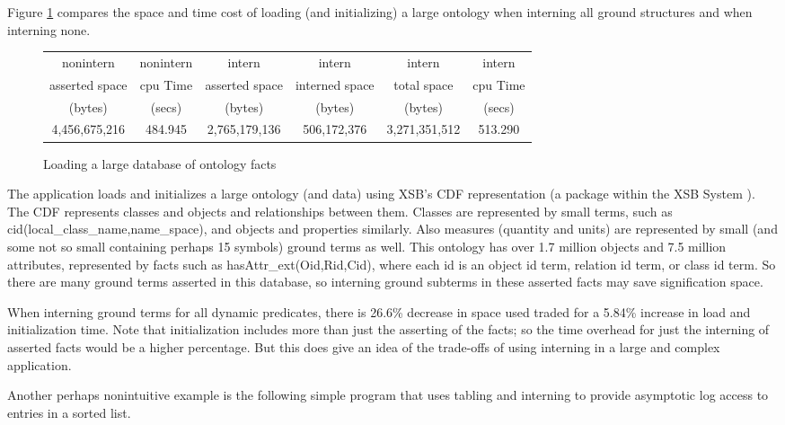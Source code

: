 \documentclass{llncs}
\begin{document}
Figure \ref{darpa-avm-table} compares the space and time cost of
loading (and initializing) a large ontology when interning all ground
structures and when interning none.  
\begin{figure}
\begin{center}
\begin{tabular}{|c|c|c|c|c|c|} \hline
nonintern &  nonintern &   intern  &     intern &  intern &   intern \\
asserted space  &  cpu Time &    asserted space &   interned space & total space &  cpu Time \\
(bytes)	 &    (secs)  &    (bytes)    &     (bytes) &   (bytes) &   (secs)     \\ \hline
4,456,675,216 & 484.945 & 2,765,179,136 & 506,172,376 & 3,271,351,512 & 513.290 \\ \hline
\end{tabular}
\caption{Loading a large database of ontology facts}\label{darpa-avm-table}
\end{center}
\end{figure}
The application loads and
initializes a large ontology (and data) using XSB's CDF representation
(a package within the XSB System \cite{xsbmanual-3.3.x}).  The CDF
represents classes and objects and relationships between them.
Classes are represented by small terms, such as
cid(local\_class\_name,name\_space), and objects and properties
similarly.  Also measures (quantity and units) are represented by
small (and some not so small containing perhaps 15 symbols) ground
terms as well.  This ontology has over 1.7 million objects and 7.5
million attributes, represented by facts such as
hasAttr\_ext(Oid,Rid,Cid), where each id is an object id term,
relation id term, or class id term.  So there are many ground terms
asserted in this database, so interning ground subterms in these
asserted facts may save signification space.

When interning ground terms for all dynamic predicates,
there is 26.6\% decrease in space used traded for a 5.84\% increase in
load and initialization time.  Note that initialization includes more
than just the asserting of the facts; so the time overhead for just
the interning of asserted facts would be a higher percentage.  But
this does give an idea of the trade-offs of using interning in a large
and complex application.

Another perhaps nonintuitive example is the following simple program
that uses tabling and interning to provide asymptotic log access to
entries in a sorted list.
\end{document}
